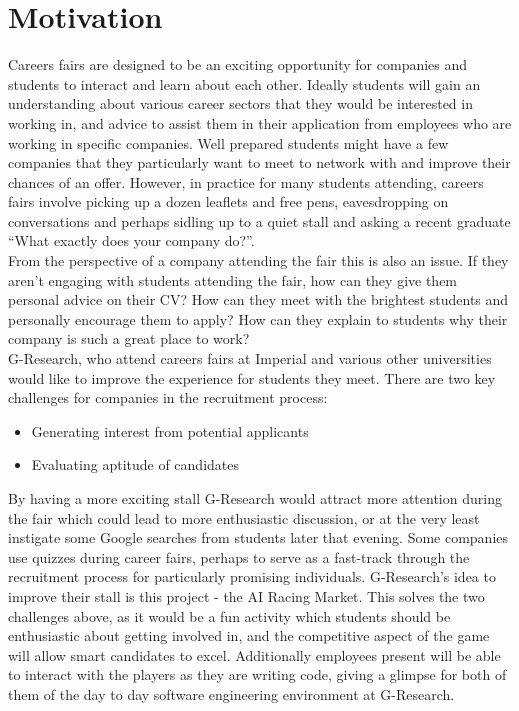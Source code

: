 \section{Motivation}
Careers fairs are designed to be an exciting opportunity for companies and students to interact and learn about each other. Ideally students will gain an understanding about various career sectors that they would be interested in working in, and advice to assist them in their application from employees who are working in specific companies. Well prepared students might have a few companies that they particularly want to meet to network with and improve their chances of an offer. However, in practice for many students attending, careers fairs involve picking up a dozen leaflets and free pens, eavesdropping on conversations and perhaps sidling up to a quiet stall and asking a recent graduate ``What exactly does your company do?''.\\

From the perspective of a company attending the fair this is also an issue. If they aren't engaging with students attending the fair, how can they give them personal advice on their CV? How can they meet with the brightest students and personally encourage them to apply? How can they explain to students why their company is such a great place to work?\\

G-Research, who attend careers fairs at Imperial and various other universities would like to improve the experience for students they meet.  There are two key challenges for companies in the recruitment process:
\begin{itemize}
	\item Generating interest from potential applicants
	\item Evaluating aptitude of candidates
\end{itemize}
By having a more exciting stall G-Research would attract more attention during the fair which could lead to more enthusiastic discussion, or at the very least instigate some Google searches from students later that evening. Some companies use quizzes during career fairs, perhaps to serve as a fast-track through the recruitment process for particularly promising individuals. G-Research's idea to improve their stall is this project - the AI Racing Market. This solves the two challenges above, as it would be a fun activity which students should be enthusiastic about getting involved in, and the competitive aspect of the game will allow smart candidates to excel. Additionally employees present will be able to interact with the players as they are writing code, giving a glimpse for both of them of the day to day software engineering environment at G-Research.

